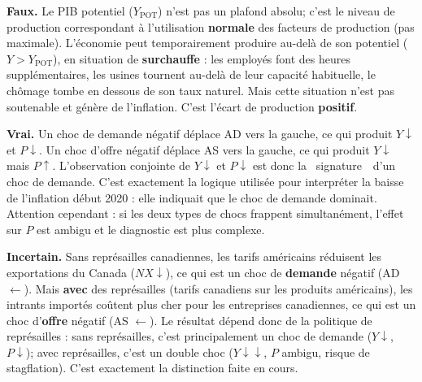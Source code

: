 
\begin{reponse}
\textbf{Faux.} Le PIB potentiel ($Y_{\text{POT}}$) n'est pas un plafond absolu; c'est le niveau de production correspondant à l'utilisation \textbf{normale} des facteurs de production (pas maximale). L'économie peut temporairement produire au-delà de son potentiel ($Y > Y_{\text{POT}}$), en situation de \textbf{surchauffe} : les employés font des heures supplémentaires, les usines tournent au-delà de leur capacité habituelle, le chômage tombe en dessous de son taux naturel. Mais cette situation n'est pas soutenable et génère de l'inflation. C'est l'écart de production \textbf{positif}.
\end{reponse}


\begin{reponse}
\textbf{Vrai.} Un choc de demande négatif déplace AD vers la gauche, ce qui produit $Y \downarrow$ et $P \downarrow$. Un choc d'offre négatif déplace AS vers la gauche, ce qui produit $Y \downarrow$ mais $P \uparrow$. L'observation conjointe de $Y \downarrow$ et $P \downarrow$ est donc la \guillemotleft~signature~\guillemotright\ d'un choc de demande. C'est exactement la logique utilisée pour interpréter la baisse de l'inflation début 2020 : elle indiquait que le choc de demande dominait. Attention cependant : si les deux types de chocs frappent simultanément, l'effet sur $P$ est ambigu et le diagnostic est plus complexe.
\end{reponse}


\begin{reponse}
\textbf{Incertain.} Sans représailles canadiennes, les tarifs américains réduisent les exportations du Canada ($NX \downarrow$), ce qui est un choc de \textbf{demande} négatif (AD $\leftarrow$). Mais \textbf{avec} des représailles (tarifs canadiens sur les produits américains), les intrants importés coûtent plus cher pour les entreprises canadiennes, ce qui est un choc d'\textbf{offre} négatif (AS $\leftarrow$). Le résultat dépend donc de la politique de représailles : sans représailles, c'est principalement un choc de demande ($Y \downarrow$, $P \downarrow$); avec représailles, c'est un double choc ($Y \downarrow\downarrow$, $P$ ambigu, risque de stagflation). C'est exactement la distinction faite en cours.
\end{reponse}

